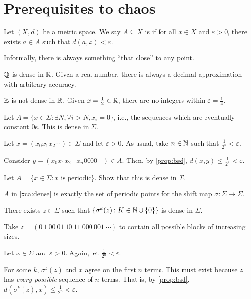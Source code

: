 \documentclass[class=pmath370,tikz,notes]{agony}
\begin{document}
\section{Prerequisites to chaos}

\begin{defn}[density]
  Let $(X,d)$ be a metric space.
  We say $A \subseteq X$ is 
  if for all $x \in X$ and $\varepsilon > 0$,
  there exists $a \in A$ such that $d(a,x) < \varepsilon$.
\end{defn}

Informally, there is always something ``that close'' to any point.

\begin{example}
  $\mathbb{Q}$ is dense in $\mathbb{R}$.
  Given a real number, there is always a decimal approximation with arbitrary accuracy.

  $\mathbb{Z}$ is not dense in $\mathbb{R}$.
  Given $x = \frac12 \in \mathbb{R}$, there are no integers within $\varepsilon = \frac14$.
\end{example}

\begin{example}
  Let $A = \{x \in \Sigma : \exists N, \forall i > N, x_i = 0\}$,
  i.e., the sequences which are eventually constant 0s.
  This is dense in $\Sigma$.
\end{example}
\begin{prf}
  Let $x = (x_0x_1x_2\cdots) \in \Sigma$ and let $\varepsilon > 0$.
  As usual, take $n \in \mathbb{N}$ such that $\frac1{2^n} < \varepsilon$.

  Consider $y = (x_0x_1x_2\cdots x_n0000\cdots) \in A$.
  Then, by \cref{prop:bsd}, $d(x,y) \leq \frac{1}{2^n} < \varepsilon$.
\end{prf}

\begin{xca}\label{xca:dense}
  Let $A = \{x \in \Sigma : \text{$x$ is periodic}\}$.
  Show that this is dense in $\Sigma$.
\end{xca}

\begin{remark}
  $A$ in \cref{xca:dense} is exactly the set of periodic points for
  the shift map $\sigma : \Sigma \to \Sigma$.
\end{remark}

\begin{prop}\label{prop:Sdense}
  There exists $z \in \Sigma$ such that $\{\sigma^k(z) : K \in \mathbb{N} \cup \{0\}\}$
  is dense in $\Sigma$.
\end{prop}
\begin{prf}
  Take $z = (0\ 1\ 00\ 01\ 10\ 11\ 000\ 001\ \cdots)$
  to contain all possible blocks of increasing sizes.

  Let $x \in \Sigma$ and $\varepsilon > 0$.
  Again, let $\frac{1}{2^n} < \varepsilon$.

  For some $k$, $\sigma^k(z)$ and $x$ agree on the first $n$ terms.
  This must exist because $z$ has \emph{every possible} sequence of $n$ terms.
  That is, by \cref{prop:bsd}, $d(\sigma^k(z),x) \leq \frac1{2^n} < \varepsilon$.
\end{prf}
\end{document}
